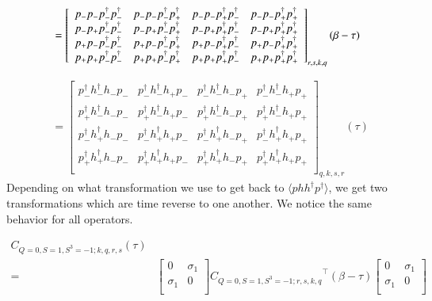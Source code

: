 \begin{equation}
  \begin{aligned}
    &= \left[ 
    {\begin{array}{cccc}
      p_{-}p_{-}p^\dagger_{-}p^\dagger_{-} & p_{-}p_{-}p^\dagger_{-}p^\dagger_{+} & p_{-}p_{-}p^\dagger_{+}p^\dagger_{-} & p_{-}p_{-}p^\dagger_{+}p^\dagger_{+} \\
      p_{-}p_{+}p^\dagger_{-}p^\dagger_{-} & p_{-}p_{+}p^\dagger_{-}p^\dagger_{+} & p_{-}p_{+}p^\dagger_{+}p^\dagger_{-} & p_{-}p_{+}p^\dagger_{+}p^\dagger_{+} \\
      p_{+}p_{-}p^\dagger_{-}p^\dagger_{-} & p_{+}p_{-}p^\dagger_{-}p^\dagger_{+} & p_{+}p_{-}p^\dagger_{+}p^\dagger_{-} & p_{+}p_{-}p^\dagger_{+}p^\dagger_{+} \\
      p_{+}p_{+}p^\dagger_{-}p^\dagger_{-} & p_{+}p_{+}p^\dagger_{-}p^\dagger_{+} & p_{+}p_{+}p^\dagger_{+}p^\dagger_{-} & p_{+}p_{+}p^\dagger_{+}p^\dagger_{+} \\
    \end{array} } 
    \right]_{r,s,k,q} (\beta-\tau) \\
  \end{aligned}
\end{equation}

\renewcommand{\dcor}[4]{p_{#2}^\dagger h_{#1}^\dagger h_{#4} p_{#3}}

\begin{equation}
  \begin{aligned}
    &= \left[ {\begin{array}{cccc}
      \dcor{-}{-}{-}{-} & \dcor{-}{-}{-}{+} & \dcor{-}{-}{+}{-} & \dcor{-}{-}{+}{+} \\
      \dcor{-}{+}{-}{-} & \dcor{-}{+}{-}{+} & \dcor{-}{+}{+}{-} & \dcor{-}{+}{+}{+} \\
      \dcor{+}{-}{-}{-} & \dcor{+}{-}{-}{+} & \dcor{+}{-}{+}{-} & \dcor{+}{-}{+}{+} \\
      \dcor{+}{+}{-}{-} & \dcor{+}{+}{-}{+} & \dcor{+}{+}{+}{-} & \dcor{+}{+}{+}{+} \\
    \end{array} } \right]_{q,k,s,r} (\tau)
  \end{aligned}
\end{equation}
Depending on what transformation we use to get back to $\langle phh^\dagger p^\dagger\rangle$, we get two transformations which are time reverse to one another. We notice the same behavior for all operators.

\begin{equation}
  \begin{aligned}
    C_{Q=0,S=1,S^3=-1;k,q,r,s} (\tau) \\
    =& \left[ {\begin{array}{cc}
      0 & \sigma_1 \\
      \sigma_1 & 0 \\
    \end{array} } \right]
    {C_{Q=0,S=1,S^3=-1;r,s,k,q}}^\top (\beta-\tau)
    \left[ {\begin{array}{cc}
      0 & \sigma_1 \\
      \sigma_1 & 0 \\
    \end{array} } \right]
  \end{aligned}
\end{equation}

